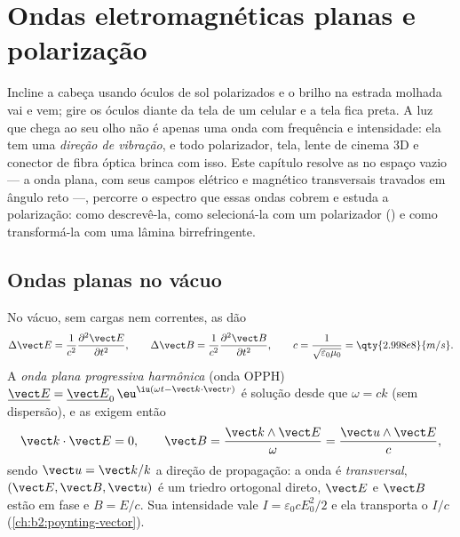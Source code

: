 \chapter{Ondas eletromagnéticas planas e polarização}\label{ch:b2:plane-waves-polarization}

Incline a cabeça usando óculos de sol polarizados e o brilho na
estrada molhada vai e vem; gire os óculos diante da tela de um celular
e a tela fica preta. A luz que chega ao seu olho não é apenas
uma onda com frequência e intensidade: ela tem uma \emph{direção de
vibração}, e todo polarizador, tela, lente de cinema 3D e conector de
fibra óptica brinca com isso. Este capítulo resolve as 
no espaço vazio --- a onda plana, com seus campos elétrico e
magnético transversais travados em ângulo reto ---, percorre o espectro que essas
ondas cobrem e estuda a polarização: como descrevê-la, como
selecioná-la com um polarizador () e como transformá-la com
uma lâmina birrefringente.

\section{Ondas planas no vácuo}

\begin{theorem}\label{thm:b2:plane-waves-polarization:wave}
No vácuo, sem cargas nem correntes, as  dão
\[
\Delta\vect E = \frac1{c^2}\frac{\partial^2\vect E}{\partial t^2} , \qquad
\Delta\vect B = \frac1{c^2}\frac{\partial^2\vect B}{\partial t^2} , \qquad
c = \frac1{\sqrt{\varepsilon_0\mu_0}} = \qty{2.998e8}{m/s} .
\]
A \emph{onda plana progressiva harmônica} (onda OPPH) $\underline{\vect E} =
\underline{\vect E}_0\,\eu^{\iu(\omega t - \vect k\cdot\vect r)}$ é solução desde que
$\omega = ck$ (sem dispersão), e as  exigem então
\[
\vect k\cdot\vect E = 0 , \qquad
\vect B = \frac{\vect k\wedge\vect E}\omega = \frac{\vect u\wedge\vect E}c ,
\]
sendo $\vect u = \vect k/k$ a direção de propagação: a onda é
\emph{transversal}, $(\vect E, \vect B, \vect u)$ é um triedro ortogonal
direto, $\vect E$ e $\vect B$ estão em fase e $B = E/c$. Sua intensidade vale
$I = \varepsilon_0cE_0^2/2$ e ela transporta o  $I/c$
(\cref{ch:b2:poynting-vector}).
\end{theorem}


